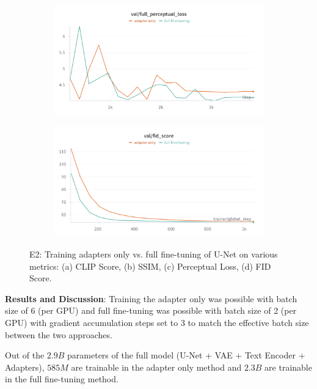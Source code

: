 \begin{figure}[htbp]
  \begin{subfigure}[b]{0.48\textwidth}
    \centering
    \includegraphics[width=\textwidth]{images/experiments/adapter_vs_full/perceptual.png}
    \label{fig:exp_adap_vs_full_perceptual}
  \end{subfigure}
  \hfill
  \begin{subfigure}[b]{0.48\textwidth}
    \centering
    \includegraphics[width=\textwidth]{images/experiments/adapter_vs_full/fid.png}
    \label{fig:exp_adap_vs_full_train_loss}
  \end{subfigure}

  \caption{E2: Training adapters only vs. full fine-tuning of U-Net on various metrics: (a) CLIP Score, (b) SSIM, (c) Perceptual Loss, (d) FID Score.}
  \label{fig:exp_adap_vs_full_metrics_grid}
\end{figure}

\textbf{Results and Discussion}:
Training the adapter only was possible with batch size of 6 (per GPU) and full fine-tuning was possible with batch size of 2 (per GPU) with gradient accumulation steps set to 3 to match the effective batch size between the two approaches.

Out of the $2.9B$ parameters of the full model (U-Net + VAE + Text Encoder + Adapters), $585M$ are trainable in the adapter only method and $2.3B$ are trainable in the full fine-tuning method.

